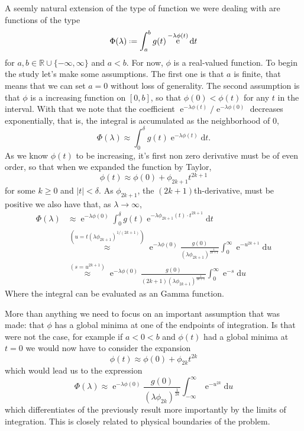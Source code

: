 \documentclass[]{report}
\DeclareMathOperator{\ee}{e}
\newcommand{\R}{\mathbb{R}}
\newcommand*{\deff}{\mathrel{\vcenter{\baselineskip0.5ex \lineskiplimit0pt
			\hbox{\scriptsize.}\hbox{\scriptsize.}}}%
	=}
\newcommand{\dd}{\mathrm{d}}
\numberwithin{equation}{section} %
\begin{document}
A seemly natural extension of the type of function we were dealing with are functions of the type
\begin{equation}
	\Phi(\lambda) \deff \int_{a}^{b} g(t) \ee^{-\lambda \phi(t)} \dd t
	\label{equation: Laplace}
\end{equation}
for $a,b \in \R \cup \{-\infty, \infty\}$ and $a<b$. For now, $\phi$ is a real-valued function. To begin the study let's make some assumptions. The first one is that $a$ is finite, that means that we can set $a=0$ without loss of generality. The second assumption is that $\phi$ is a increasing function on $[0,b]$, so that $\phi(0) < \phi(t)$ for any $t$ in the interval. With that we note that the coefficient $\ee^{-\lambda \phi(t)} / \ee^{-\lambda \phi(0)}$ decreases exponentially, that is, the integral is accumulated as the neighborhood of $0$,
$$\Phi(\lambda) \approx \int_{0}^{\delta} g(t) \ee^{-\lambda \phi(t)} \dd t.$$
As we know $\phi(t)$ to be increasing, it's first non zero derivative must be of even order, so that when we expanded the function by Taylor, 
$$\phi(t) \approx \phi(0) + \phi_{2k+1} t^{2k+1}$$
for some $k\geq 0$ and $|t| < \delta$. As $\phi_{2k+1}$, the $(2k+1)$th-derivative, must be positive we also have that, as $\lambda \rightarrow \infty$,
\begin{equation*}
	\begin{split}
		\Phi(\lambda) & \approx \ee^{-\lambda \phi(0)} \int_{0}^{\delta} g(t) \ee^{-\lambda \phi_{2k+1}(t) \cdot t^{2k+1}} \dd t\\
		& \stackrel{(u=t(\lambda \phi_{2k+1})^{1/(2k+1)})}{\approx} \ee^{-\lambda \phi(0)} \frac{g(0)}{(\lambda \phi_{2k+1})^{\frac{1}{2k+1}}} \int_{0}^{\infty} \ee^{-u^{2k+1}} \dd u \\
		& \stackrel{(s=u^{2k+1})}{\approx} \ee^{-\lambda \phi(0)} \frac{g(0)}{ (2k+1)(\lambda \phi_{2k+1})^{\frac{1}{2k+1}}} \int_{0}^{\infty} \ee^{-s} \dd u
	\end{split}
\end{equation*}
Where the integral can be evaluated as an Gamma function.

More than anything we need to focus on an important assumption that was made: that $\phi$ has a global minima at one of the endpoints of integration. Is that were not the case, for example if $a < 0 < b$ and $\phi(t)$ had a global minima at $t=0$ we would now have to consider the expansion
$$\phi(t) \approx \phi(0) + \phi_{2k} t^{2k}$$
which would lead us to the expression
$$\Phi(\lambda) \approx \ee^{-\lambda \phi(0)} \frac{g(0)}{(\lambda \phi_{2k})^{\frac{1}{2k}}} \int_{-\infty}^{\infty} \ee^{-u^{2k}} \dd u$$
which differentiates of the previously result more importantly by the limits of integration. This is closely related to physical boundaries of the problem.
\end{document}
